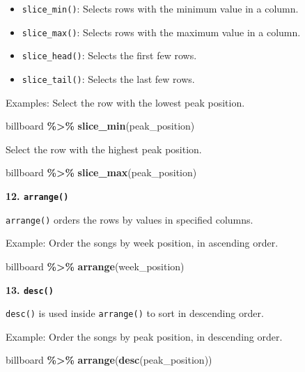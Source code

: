 \documentclass[
]{book}
\newenvironment{Shaded}{\begin{snugshade}}{\end{snugshade}}
\newcommand{\FunctionTok}[1]{\textcolor[rgb]{0.13,0.29,0.53}{\textbf{#1}}}
\newcommand{\NormalTok}[1]{#1}
\newcommand{\SpecialCharTok}[1]{\textcolor[rgb]{0.81,0.36,0.00}{\textbf{#1}}}
\providecommand{\tightlist}{%
  \setlength{\itemsep}{0pt}\setlength{\parskip}{0pt}}
\begin{document}
\begin{itemize}
\tightlist
\item
  \texttt{slice\_min()}: Selects rows with the minimum value in a column.
\item
  \texttt{slice\_max()}: Selects rows with the maximum value in a column.
\item
  \texttt{slice\_head()}: Selects the first few rows.
\item
  \texttt{slice\_tail()}: Selects the last few rows.
\end{itemize}

Examples: Select the row with the lowest peak position.

\begin{Shaded}
\begin{Highlighting}[]
\NormalTok{billboard }\SpecialCharTok{\%\textgreater{}\%}
  \FunctionTok{slice\_min}\NormalTok{(peak\_position)}
\end{Highlighting}
\end{Shaded}

Select the row with the highest peak position.

\begin{Shaded}
\begin{Highlighting}[]
\NormalTok{billboard }\SpecialCharTok{\%\textgreater{}\%}
  \FunctionTok{slice\_max}\NormalTok{(peak\_position)}
\end{Highlighting}
\end{Shaded}

\textbf{12. \texttt{arrange()}}

\texttt{arrange()} orders the rows by values in specified columns.

Example: Order the songs by week position, in ascending order.

\begin{Shaded}
\begin{Highlighting}[]
\NormalTok{billboard }\SpecialCharTok{\%\textgreater{}\%}
  \FunctionTok{arrange}\NormalTok{(week\_position)}
\end{Highlighting}
\end{Shaded}

\textbf{13. \texttt{desc()}}

\texttt{desc()} is used inside \texttt{arrange()} to sort in descending order.

Example: Order the songs by peak position, in descending order.

\begin{Shaded}
\begin{Highlighting}[]
\NormalTok{billboard }\SpecialCharTok{\%\textgreater{}\%}
  \FunctionTok{arrange}\NormalTok{(}\FunctionTok{desc}\NormalTok{(peak\_position))}
\end{Highlighting}
\end{Shaded}
\end{document}
